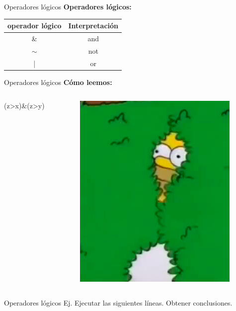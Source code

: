 \documentclass{bredelebeamer}
\begin{document}
\begin{frame}{Operadores lógicos}
\textbf{Operadores lógicos:}
\begin{table}[]
\centering
\begin{tabular}{|c|c|}
\hline
operador lógico & Interpretación \\ \hline
\&              & and            \\ \hline
$\sim$          & not            \\ \hline
|               & or             \\ \hline
\end{tabular}
\end{table}
\end{frame}

\begin{frame}{Operadores lógicos}
\textbf{Cómo leemos:}
\begin{columns}
\begin{column}{0.5\textwidth}
\begin{center}
\Huge (z>x)\&(z>y)
\end{center}
\end{column}
\begin{column}{0.5\textwidth}
\begin{center}
\includegraphics[scale=0.4]{images/img41.png}
\end{center}
\end{column}
\end{columns}
\end{frame}

\begin{frame}{Operadores lógicos}
Ej. Ejecutar las siguientes líneas. Obtener conclusiones.

\end{frame}
\end{document}

